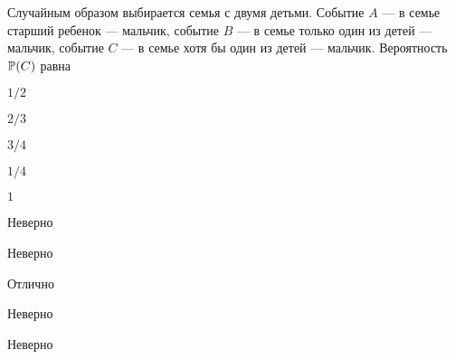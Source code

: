 
\begin{question}
Случайным образом выбирается семья с двумя детьми. Событие \(A\) — в
семье старший ребенок — мальчик, событие \(B\) — в семье только один
из детей — мальчик, событие \(C\) — в семье хотя бы один из детей
--- мальчик. Вероятность \(\P(C)\) равна
\begin{answerlist}
  \item \(1/2\)
  \item \(2/3\)
  \item \(3/4\)
  \item \(1/4\)
  \item \(1\)
\end{answerlist}
\end{question}

\begin{solution}
\begin{answerlist}
  \item Неверно
  \item Неверно
  \item Отлично
  \item Неверно
  \item Неверно
\end{answerlist}
\end{solution}

